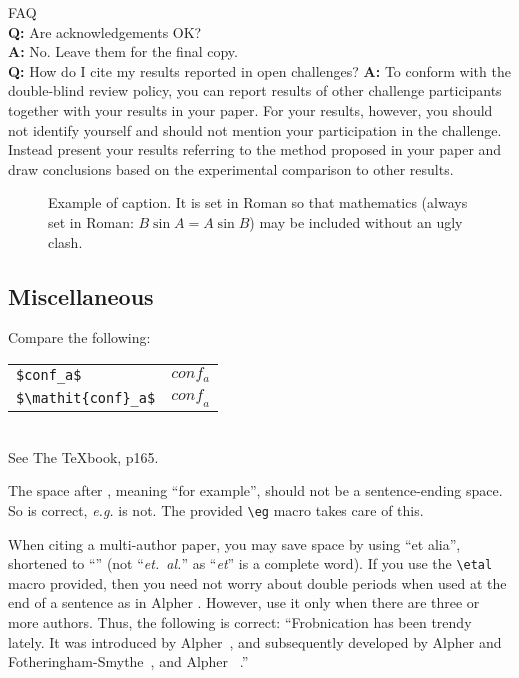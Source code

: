\documentclass[10pt,twocolumn,letterpaper]{article}
\begin{document}
    \noindent
    FAQ\medskip\\
    {\bf Q:} Are acknowledgements OK?\\
    {\bf A:} No. Leave them for the final copy.\medskip\\
    {\bf Q:} How do I cite my results reported in open challenges?
        {\bf A:} To conform with the double-blind review policy, you can report results of other challenge participants together with your results in your paper.
    For your results, however, you should not identify yourself and should not mention your participation in the challenge.
    Instead present your results referring to the method proposed in your paper and draw conclusions based on the experimental comparison to other results.\medskip\\

    \begin{figure}[t]
        \centering
        \fbox{\rule{0pt}{2in} \rule{0.9\linewidth}{0pt}}

        \caption{Example of caption.
        It is set in Roman so that mathematics (always set in Roman: $B \sin A = A \sin B$) may be included without an ugly clash.}
        \label{fig:onecol}
    \end{figure}

    \subsection{Miscellaneous}

    \noindent
    Compare the following:\\
    \begin{tabular}{ll}
        \verb'$conf_a$'          & $conf_a$          \\
        \verb'$\mathit{conf}_a$' & $\mathit{conf}_a$
    \end{tabular}\\
    See The \TeX book, p165.

    The space after \eg, meaning ``for example'', should not be a sentence-ending space.
    So \eg is correct, {\em e.g.} is not.
    The provided \verb'\eg' macro takes care of this.

    When citing a multi-author paper, you may save space by using ``et alia'', shortened to ``\etal'' (not ``{\em et.\ al.}'' as ``{\em et}'' is a complete word).
    If you use the \verb'\etal' macro provided, then you need not worry about double periods when used at the end of a sentence as in Alpher \etal.
    However, use it only when there are three or more authors.
    Thus, the following is correct:
    ``Frobnication has been trendy lately.
    It was introduced by Alpher~\cite{Alpher02}, and subsequently developed by
    Alpher and Fotheringham-Smythe~\cite{Alpher03}, and Alpher \etal~\cite{Alpher04}.''
\end{document}
